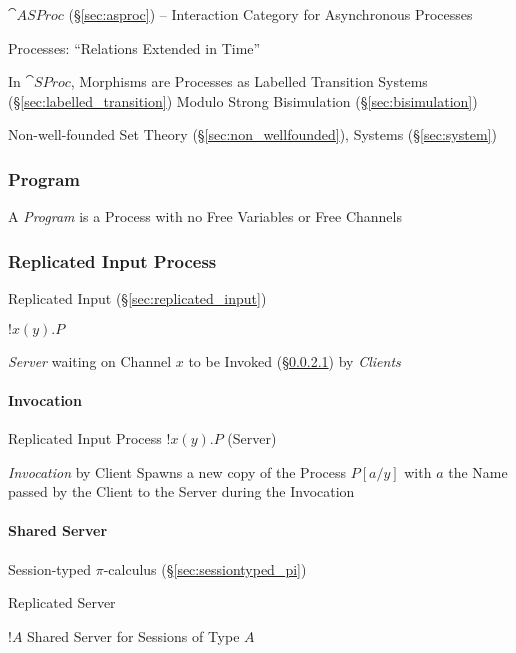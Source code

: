 $\cat{ASProc}$ (\S\ref{sec:asproc}) -- Interaction Category for
Asynchronous Processes

Processes: ``Relations Extended in Time''

In $\cat{SProc}$, Morphisms are Processes as Labelled Transition
Systems (\S\ref{sec:labelled_transition}) Modulo Strong Bisimulation
(\S\ref{sec:bisimulation})

Non-well-founded Set Theory (\S\ref{sec:non_wellfounded}), Systems
(\S\ref{sec:system})



\subsubsection{Program}\label{sec:program}

A \emph{Program} is a Process with no Free Variables or Free Channels



\subsubsection{Replicated Input Process}
\label{sec:replicated_input_process}

Replicated Input (\S\ref{sec:replicated_input})

$!x(y).P$

\emph{Server} waiting on Channel $x$ to be Invoked
(\S\ref{sec:invocation}) by \emph{Clients}



\paragraph{Invocation}\label{sec:invocation}\hfill

Replicated Input Process $!x(y).P$ (Server)

\emph{Invocation} by Client Spawns a new copy of the Process $P[a/y]$
with $a$ the Name passed by the Client to the Server during the
Invocation



\paragraph{Shared Server}\label{sec:shared_server}\hfill

Session-typed $\pi$-calculus (\S\ref{sec:sessiontyped_pi})

Replicated Server

$!A$ Shared Server for Sessions of Type $A$



